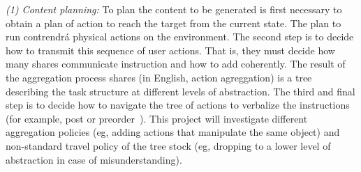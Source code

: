\emph{(1) Content planning:} To plan the content to be generated is first
necessary to obtain a plan of action to reach the target from the current state.
The plan to run contrendrá physical actions on the environment. The second step
is to decide how to transmit this sequence of user actions. That is, they must
decide how many shares communicate instruction and how to add coherently. The
result of the aggregation process shares (in English, action agreggation) is a
tree describing the task structure at different levels of abstraction. The third
and final step is to decide how to navigate the tree of actions to verbalize the
instructions (for example, post or preorder~\cite{foster-etal-ijcai2009}). This
project will investigate different aggregation policies (eg, adding actions that
manipulate the same object) and non-standard travel policy of the tree stock
(eg, dropping to a lower level of abstraction in case of misunderstanding).


